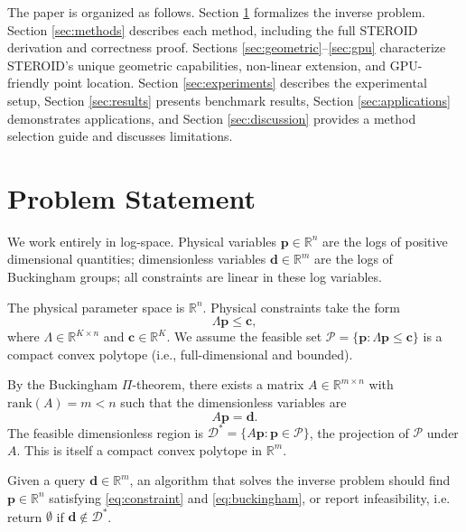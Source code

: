 \documentclass[review,onefignum,onetabnum]{./SIAM_template/siamart171218}
\begin{document}
The paper is organized as follows.
Section \ref{sec:problem} formalizes the inverse problem.
Section \ref{sec:methods} describes each method, including the full STEROID derivation
and correctness proof.
Sections \ref{sec:geometric}--\ref{sec:gpu} characterize STEROID's unique geometric
capabilities, non-linear extension, and GPU-friendly point location.
Section \ref{sec:experiments} describes the experimental setup,
Section \ref{sec:results} presents benchmark results,
Section \ref{sec:applications} demonstrates applications, and
Section \ref{sec:discussion} provides a method selection guide and discusses limitations.

\section{Problem Statement}
\label{sec:problem}

We work entirely in log-space.  Physical variables $\mathbf{p} \in \mathbb{R}^n$
are the logs of positive dimensional quantities; dimensionless variables
$\mathbf{d} \in \mathbb{R}^m$ are the logs of Buckingham groups; all constraints
are linear in these log variables.

The physical parameter space is $\mathbb{R}^n$.  Physical constraints take the form
\begin{equation}
	\label{eq:constraint}
	\Lambda \mathbf{p} \leq \mathbf{c},
\end{equation}
where $\Lambda \in \mathbb{R}^{K \times n}$ and $\mathbf{c} \in \mathbb{R}^K$.
We assume the feasible set $\mathcal{P} = \{\mathbf{p} : \Lambda\mathbf{p} \leq
	\mathbf{c}\}$ is a compact convex polytope (i.e., full-dimensional and bounded).

By the Buckingham $\Pi$-theorem, there exists a matrix $A \in \mathbb{R}^{m \times n}$
with $\mathrm{rank}(A) = m < n$ such that the dimensionless variables are
\begin{equation}
	\label{eq:buckingham}
	A\mathbf{p} = \mathbf{d}.
\end{equation}
The feasible dimensionless region is $\mathcal{D}^* = \{A\mathbf{p} :
	\mathbf{p} \in \mathcal{P}\}$, the projection of $\mathcal{P}$ under $A$.
This is itself a compact convex polytope in $\mathbb{R}^m$.

Given a query $\mathbf{d} \in \mathbb{R}^m$, an algorithm that solves the
inverse problem should find $\mathbf{p} \in \mathbb{R}^n$ satisfying
\eqref{eq:constraint} and \eqref{eq:buckingham}, or report infeasibility, i.e.
return $\emptyset$ if $\mathbf{d} \notin \mathcal{D}^*$.
\end{document}
